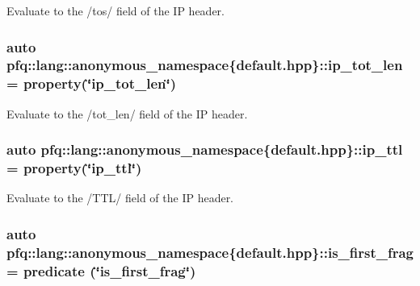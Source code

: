 Evaluate to the /tos/ field of the I\+P header. 

\hypertarget{namespacepfq_1_1lang_1_1anonymous__namespace_02default_8hpp_03_a48d42ce1bea31f55be3377e8f2c41bbe}{
\subsubsection[{ip\+\_\+tot\+\_\+len}]{\setlength{\rightskip}{0pt plus 5cm}auto pfq\+::lang\+::anonymous\+\_\+namespace\{default.\+hpp\}\+::ip\+\_\+tot\+\_\+len = {\bf property}(\char`\"{}ip\+\_\+tot\+\_\+len\char`\"{})}}\label{namespacepfq_1_1lang_1_1anonymous__namespace_02default_8hpp_03_a48d42ce1bea31f55be3377e8f2c41bbe}


Evaluate to the /tot\+\_\+len/ field of the I\+P header. 

\hypertarget{namespacepfq_1_1lang_1_1anonymous__namespace_02default_8hpp_03_a885339d6e5b34ec5d037e085dfba9851}{
\subsubsection[{ip\+\_\+ttl}]{\setlength{\rightskip}{0pt plus 5cm}auto pfq\+::lang\+::anonymous\+\_\+namespace\{default.\+hpp\}\+::ip\+\_\+ttl = {\bf property}(\char`\"{}ip\+\_\+ttl\char`\"{})}}\label{namespacepfq_1_1lang_1_1anonymous__namespace_02default_8hpp_03_a885339d6e5b34ec5d037e085dfba9851}


Evaluate to the /\+T\+T\+L/ field of the I\+P header. 

\hypertarget{namespacepfq_1_1lang_1_1anonymous__namespace_02default_8hpp_03_afb797cc442d04e614a9ac68c7c4c35ff}{
\subsubsection[{is\+\_\+first\+\_\+frag}]{\setlength{\rightskip}{0pt plus 5cm}auto pfq\+::lang\+::anonymous\+\_\+namespace\{default.\+hpp\}\+::is\+\_\+first\+\_\+frag = {\bf predicate} (\char`\"{}is\+\_\+first\+\_\+frag\char`\"{})}}\label{namespacepfq_1_1lang_1_1anonymous__namespace_02default_8hpp_03_afb797cc442d04e614a9ac68c7c4c35ff}


